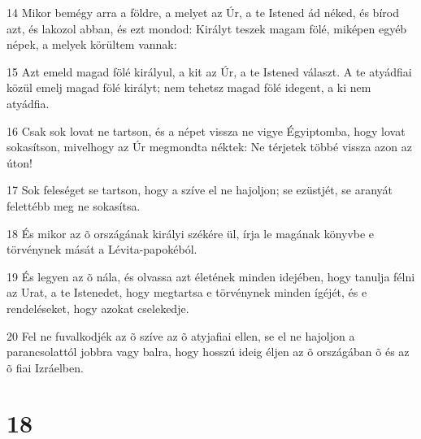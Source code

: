\par 14 Mikor bemégy arra a földre, a melyet az Úr, a te Istened ád néked, és bírod azt, és lakozol abban, és ezt mondod: Királyt teszek magam fölé, miképen egyéb népek, a melyek körültem vannak:
\par 15 Azt emeld magad fölé királyul, a kit az Úr, a te Istened választ. A te atyádfiai közül emelj magad fölé királyt; nem tehetsz magad fölé idegent, a ki nem atyádfia.
\par 16 Csak sok lovat ne tartson, és a népet vissza ne vigye Égyiptomba, hogy lovat sokasítson, mivelhogy az Úr megmondta néktek: Ne térjetek többé vissza azon az úton!
\par 17 Sok feleséget se tartson, hogy a szíve el ne hajoljon; se ezüstjét, se aranyát felettébb meg ne sokasítsa.
\par 18 És mikor az õ országának királyi székére ül, írja le magának könyvbe e törvénynek mását a Lévita-papokéból.
\par 19 És legyen az õ nála, és olvassa azt életének minden idejében, hogy tanulja félni az Urat, a te Istenedet, hogy megtartsa e törvénynek minden ígéjét, és e rendeléseket, hogy azokat cselekedje.
\par 20 Fel ne fuvalkodjék az õ szíve az õ atyjafiai ellen, se el ne hajoljon a parancsolattól jobbra vagy balra, hogy hosszú ideig éljen az õ országában õ és az õ fiai Izráelben.

\chapter{18}

